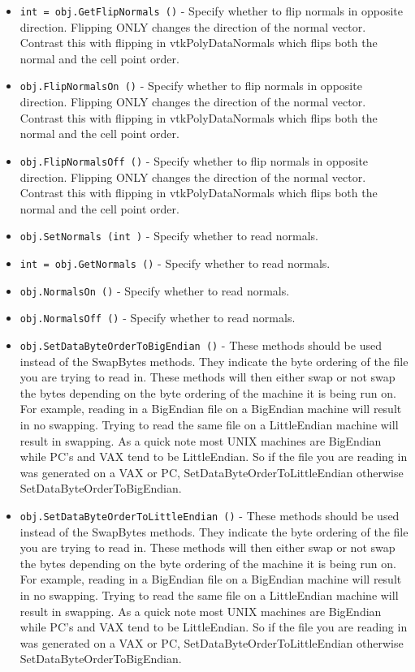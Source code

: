 \begin{itemize}
\item  \verb|int = obj.GetFlipNormals ()| -  Specify whether to flip normals in opposite direction. Flipping ONLY
 changes the direction of the normal vector. Contrast this with flipping
 in vtkPolyDataNormals which flips both the normal and the cell point
 order.

\item  \verb|obj.FlipNormalsOn ()| -  Specify whether to flip normals in opposite direction. Flipping ONLY
 changes the direction of the normal vector. Contrast this with flipping
 in vtkPolyDataNormals which flips both the normal and the cell point
 order.

\item  \verb|obj.FlipNormalsOff ()| -  Specify whether to flip normals in opposite direction. Flipping ONLY
 changes the direction of the normal vector. Contrast this with flipping
 in vtkPolyDataNormals which flips both the normal and the cell point
 order.

\item  \verb|obj.SetNormals (int )| -  Specify whether to read normals.

\item  \verb|int = obj.GetNormals ()| -  Specify whether to read normals.

\item  \verb|obj.NormalsOn ()| -  Specify whether to read normals.

\item  \verb|obj.NormalsOff ()| -  Specify whether to read normals.

\item  \verb|obj.SetDataByteOrderToBigEndian ()| -  These methods should be used instead of the SwapBytes methods.
 They indicate the byte ordering of the file you are trying
 to read in. These methods will then either swap or not swap
 the bytes depending on the byte ordering of the machine it is
 being run on. For example, reading in a BigEndian file on a
 BigEndian machine will result in no swapping. Trying to read
 the same file on a LittleEndian machine will result in swapping.
 As a quick note most UNIX machines are BigEndian while PC's
 and VAX tend to be LittleEndian. So if the file you are reading
 in was generated on a VAX or PC, SetDataByteOrderToLittleEndian otherwise
 SetDataByteOrderToBigEndian. 

\item  \verb|obj.SetDataByteOrderToLittleEndian ()| -  These methods should be used instead of the SwapBytes methods.
 They indicate the byte ordering of the file you are trying
 to read in. These methods will then either swap or not swap
 the bytes depending on the byte ordering of the machine it is
 being run on. For example, reading in a BigEndian file on a
 BigEndian machine will result in no swapping. Trying to read
 the same file on a LittleEndian machine will result in swapping.
 As a quick note most UNIX machines are BigEndian while PC's
 and VAX tend to be LittleEndian. So if the file you are reading
 in was generated on a VAX or PC, SetDataByteOrderToLittleEndian otherwise
 SetDataByteOrderToBigEndian. 


\end{itemize}
